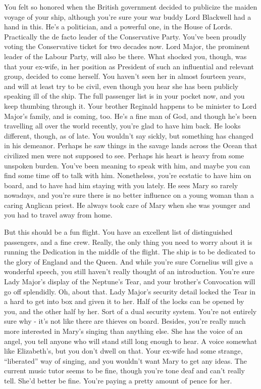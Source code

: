 \documentclass[char]{guildcamp1}
\begin{document}
You felt so honored when the British government decided to publicize
the maiden voyage of your ship, although you're sure your war buddy
Lord Blackwell had a hand in this. He's a politician, and a powerful
one, in the House of Lords. Practically the de facto leader of the
Conservative Party. You've been proudly voting the Conservative ticket
for two decades now. Lord Major, the prominent leader of the Labour
Party, will also be there. What shocked you, though, was that your
ex-wife, in her position as President of such an influential and
relevant group, decided to come herself. You haven't seen her in
almost fourteen years, and will at least try to be civil, even though
you hear she has been publicly speaking ill of the ship. The full
passenger list is in your pocket now, and you keep thumbing through
it. Your brother Reginald happens to be minister to Lord Major's
family, and is coming, too. He's a fine man of God, and though he's
been travelling all over the world recently, you're glad to have him
back. He looks different, though, as of late.  You wouldn't say
sickly, but something has changed in his demeanor. Perhaps he saw
things in the savage lands across the Ocean that civilized men were
not supposed to see. Perhaps his heart is heavy from some unspoken
burden. You've been meaning to speak with him, and maybe you can find
some time off to talk with him. Nonetheless, you're ecstatic to have
him on board, and to have had him staying with you lately. He sees
Mary so rarely nowadays, and you're sure there is no better influence
on a young woman than a caring Anglican priest. He always took care of
Mary when she was younger and you had to travel away from home.

But this should be a fun flight. You have an excellent list of
distinguished passengers, and a fine crew. Really, the only thing you
need to worry about it is running the Dedication in the middle of
the flight. The ship is to be dedicated to the glory of England and the Queen.
And while you're sure Cornelius will give a wonderful
speech, you still haven't really thought of an introduction. You're
sure Lady Major's display of the Neptune's Tear, and your brother's
Convocation will go off splendidly. Oh, about that. Lady Major's security detail locked the Tear in a hard to get into box and given it to her. Half of the locks can be opened by you, and the other half by her. Sort of a dual security system. You're not entirely sure why - it's not like there are thieves on board. Besides, you're really much more
interested in Mary's singing than anything else. She has the voice of
an angel, you tell anyone who will stand still long enough to hear. A
voice somewhat like Elizabeth's, but you don't dwell on that.  Your
ex-wife had some strange, ``liberated'' way of singing, and you
wouldn't want Mary to get any ideas. The current music tutor seems to
be fine, though you're tone deaf and can't really tell. She'd better
be fine. You're paying a pretty amount of pence for her.
\end{document}
